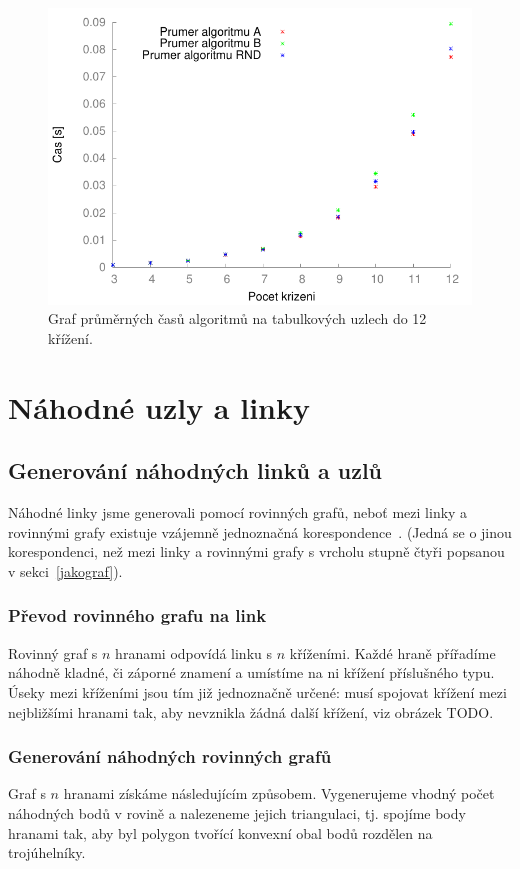 \begin{figure}[p]\centering
\includegraphics{../img/srovTable}
\caption{Graf průměrných časů algoritmů na tabulkových uzlech do 12 křížení.}
\label{obr03:srovTable}
\end{figure}


\section{Náhodné uzly a linky}

\subsection{Generování náhodných linků a uzlů}
Náhodné linky jsme generovali pomocí rovinných grafů, neboť mezi linky a rovinnými grafy existuje vzájemně jednoznačná korespondence~\cite{Adams2004}. (Jedná se o jinou korespondenci, než mezi linky a rovinnými grafy s vrcholu stupně čtyři popsanou v sekci~\ref{jakograf}).

\subsubsection{Převod rovinného grafu na link}
Rovinný graf s $n$ hranami odpovídá linku s $n$ kříženími. Každé hraně přířadíme náhodně kladné, či záporné znamení a umístíme na ni křížení příslušného typu. Úseky mezi kříženími jsou tím již jednoznačně určené: musí spojovat křížení mezi nejbližšími hranami tak, aby nevznikla žádná další křížení, viz obrázek TODO.

\subsubsection{Generování náhodných rovinných grafů}
Graf s $n$ hranami získáme následujícím způsobem. Vygenerujeme vhodný počet náhodných bodů v rovině a nalezeneme jejich triangulaci, tj. spojíme body hranami tak, aby byl polygon tvořící konvexní obal bodů rozdělen na trojúhelníky.


